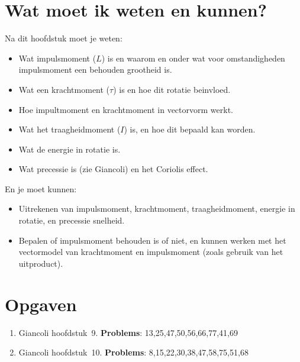 \section{Wat moet ik weten en kunnen?}

Na dit hoofdstuk moet je weten:
\begin{itemize}
\item Wat impulsmoment ($L$) is en waarom en onder wat voor omstandigheden impulsmoment een behouden grootheid is.
\item Wat een krachtmoment ($\tau$) is en hoe dit rotatie beinvloed.
\item Hoe impultmoment en krachtmoment in vectorvorm werkt.
\item Wat het traagheidmoment ($I$) is, en hoe dit bepaald kan worden.
\item Wat de energie in rotatie is.
\item Wat precessie is (zie Giancoli) en het Coriolis effect.
\end{itemize}
En je moet kunnen:
\begin{itemize}
\item Uitrekenen van impulsmoment, krachtmoment, traagheidmoment, energie in rotatie, en precessie snelheid.
\item Bepalen of impulsmoment behouden is of niet, en kunnen werken met het vectormodel van krachtmoment en impulsmoment (zoals gebruik van het uitproduct).
\end{itemize}

\section{Opgaven}

\begin{enumerate}
\item Giancoli hoofdstuk~9. {\bf Problems}: 13,25,47,50,56,66,77,41,69
\item Giancoli hoofdstuk~10. {\bf Problems}: 8,15,22,30,38,47,58,75,51,68

\end{enumerate}


